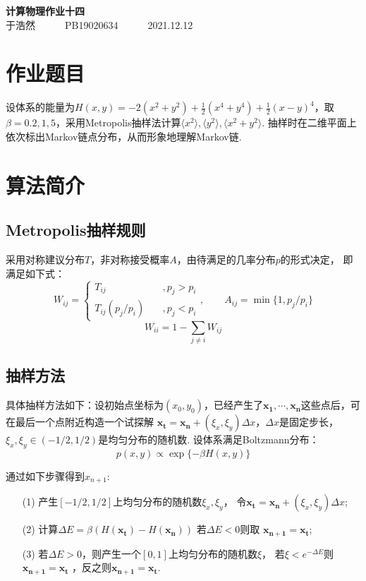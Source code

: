 \documentclass[12pt,a4paper,utf8]{ctexart}
\begin{document}
\begin{center}
    {\LARGE\textbf{计算物理作业十四}}\\
    \textrm{于浩然}~~~~~~\textrm{PB19020634}~~~~~~\textrm{2021.12.12}
\end{center}
\section{作业题目}

设体系的能量为$H(x,y)=-2(x^2+y^2)+ \frac{1}{2}(x^4+y^4)+ \frac{1}{2}(x-y)^4$，取
$\beta=0.2,1,5$，采用Metropolis抽样法计算$ \langle x^2 \rangle, \langle y^2
\rangle, \langle x^2 + y^2 \rangle   $.
抽样时在二维平面上依次标出Markov链点分布，从而形象地理解Markov链. 

\section{算法简介}
\subsection{Metropolis抽样规则}

采用对称建议分布$T$，非对称接受概率$A$，由待满足的几率分布$p$的形式决定，
即满足如下式：
\begin{equation}
    W_{ij} = 
    \begin{cases}
        T_{ij} \quad &,p_j > p_i \\
        T_{ij} (p_j/p_i) \quad&, p_j < p_i
    \end{cases}
    ,\qquad 
    A_{ij} = \min\{1, p_j/p_i\}
\end{equation}
\begin{equation}
    W_{ii} = 1- \sum _{j\neq i}W_{ij}
\end{equation}
\subsection{抽样方法}

具体抽样方法如下：设初始点坐标为$(x_0,
y_0)$，已经产生了$\mathbf{x_1},\cdots,\mathbf{x_n}$这些点后，可在最后一个点附近构造一个试探解
$\mathbf{x_t} = \mathbf{x_n} + (\xi_x, \xi_y)\Delta x$，$\Delta
x$是固定步长，$\xi_x, \xi_y \in
(-1/2, 1/2)$是均匀分布的随机数. 
设体系满足Boltzmann分布：
\begin{equation}
    p(x, y) \propto \exp \{-\beta H(x,y)\}
\end{equation}

通过如下步骤得到$x_{n+1}$: 
\begin{enumerate}
    \item[(1)] 产生$[-1/2,1/2]$上均匀分布的随机数$\xi_x, \xi_y$，
        令$\mathbf{x_t} = \mathbf{x_n} + (\xi_x, \xi_y)\Delta x$; 
    \item[(2)] 计算$\Delta E = \beta(H(\mathbf{x_t}) - H(\mathbf{x_{n}}))$
        若$\Delta E < 0$则取
        $\mathbf{x_{n+1}} = \mathbf{x_t}$;
    \item[(3)] 若$\Delta E > 0$，则产生一个$[0,1]$上均匀分布的随机数$\xi$，
        若$\xi < e^{- \Delta E}$则$\mathbf{x_{n+1}} = \mathbf{x_t}$
        ，反之则$\mathbf{x_{n+1}} = \mathbf{x_t}$. 
\end{enumerate}
\end{document}
